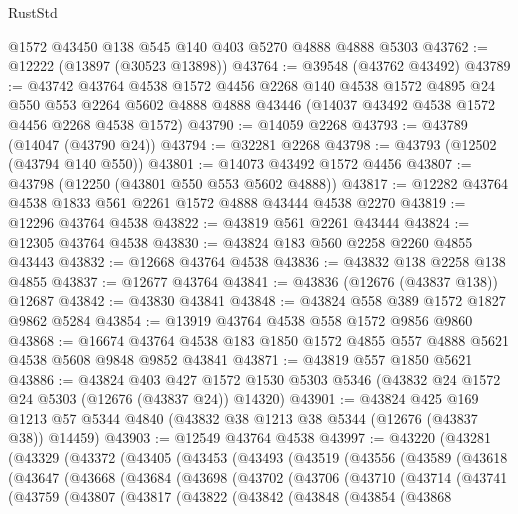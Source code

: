 \begin{lexlean}{RustStd}
\begin{coremodule}
    @1572
    @43450
    @138
    @545
    @140
    @403
    @5270
    @4888
    @4888
    @5303
@43762 := @12222 (@13897 (@30523 @13898))
@43764 := @39548 (@43762 @43492)
@43789 := @43742
    @43764
    @4538
    @1572
    @4456
    @2268
    @140
    @4538
    @1572
    @4895
    @24
    @550
    @553
    @2264
    @5602
    @4888
    @4888
    @43446
    (@14037 @43492 @4538 @1572 @4456 @2268 @4538 @1572)
@43790 := @14059 @2268
@43793 := @43789 (@14047 (@43790 @24))
@43794 := @32281 @2268
@43798 := @43793 (@12502 (@43794 @140 @550))
@43801 := @14073 @43492 @1572 @4456
@43807 := @43798 (@12250 (@43801 @550 @553 @5602 @4888))
@43817 := @12282 @43764 @4538 @1833 @561 @2261 @1572 @4888 @43444 @4538 @2270
@43819 := @12296 @43764 @4538
@43822 := @43819 @561 @2261 @43444
@43824 := @12305 @43764 @4538
@43830 := @43824 @183 @560 @2258 @2260 @4855 @43443
@43832 := @12668 @43764 @4538
@43836 := @43832 @138 @2258 @138 @4855
@43837 := @12677 @43764
@43841 := @43836 (@12676 (@43837 @138)) @12687
@43842 := @43830 @43841
@43848 := @43824 @558 @389 @1572 @1827 @9862 @5284
@43854 := @13919 @43764 @4538 @558 @1572 @9856 @9860
@43868 := @16674 @43764 @4538 @183 @1850 @1572 @4855 @557 @4888 @5621 @4538 @5608 @9848 @9852 @43841
@43871 := @43819 @557 @1850 @5621
@43886 := @43824
    @403
    @427
    @1572
    @1530
    @5303
    @5346
    (@43832 @24 @1572 @24 @5303 (@12676 (@43837 @24)) @14320)
@43901 := @43824
    @425
    @169
    @1213
    @57
    @5344
    @4840
    (@43832 @38 @1213 @38 @5344 (@12676 (@43837 @38)) @14459)
@43903 := @12549 @43764 @4538
@43997 := @43220
    (@43281
      (@43329
        (@43372
          (@43405
            (@43453
              (@43493
                (@43519
                  (@43556
                    (@43589
                      (@43618
                        (@43647
                          (@43668
                            (@43684
                              (@43698
                                (@43702
                                  (@43706
                                    (@43710
                                      (@43714
                                        (@43741
                                          (@43759
                                            (@43807
                                              (@43817
                                                (@43822
                                                  (@43842
                                                    (@43848
                                                      (@43854
                                                        (@43868

\end{coremodule}
\end{lexlean}
